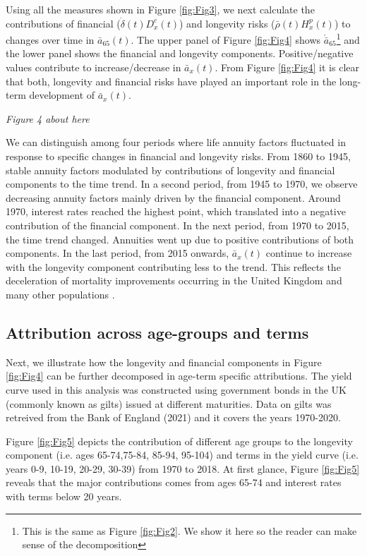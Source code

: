 \documentclass[12pt]{article}
\begin{document}
Using all the measures shown in Figure \ref{fig:Fig3}, we next calculate the contributions of financial ($\dot{\delta}(t){D}^{c}_x(t)$) and longevity risks ($\bar{\rho}(t){H}^{p}_x(t)$) to changes over time in $\bar{a}_{65}(t)$. The upper panel of Figure \ref{fig:Fig4} shows $\acute{\bar{a}}_{65}$\footnote{This is the same as Figure \ref{fig:Fig2}. We show it here so the reader can make sense of the decomposition} and the lower panel shows the financial and longevity components. Positive/negative values contribute to increase/decrease in $\bar{a}_x(t)$. From Figure \ref{fig:Fig4} it is clear that both, longevity and financial risks have played an important role in the long-term development of $\bar{a}_x(t)$. 

  \begin{center}
	\textit{Figure 4 about here}
\end{center}

We can distinguish among four periods where life annuity factors fluctuated in response to specific changes in financial and longevity risks. From 1860 to 1945, stable annuity factors modulated by  contributions of longevity and financial components to the time trend. In a second period, from 1945 to 1970, we observe decreasing annuity factors mainly driven by the financial component. Around 1970, interest rates reached the highest point, which translated into a negative contribution of the financial component. In the next period, from 1970 to 2015, the time trend changed. Annuities went up due to positive contributions of both components. In the last period, from 2015 onwards, $\bar{a}_x(t)$ continue to increase with the longevity component contributing less to the trend. This reflects the deceleration of mortality improvements occurring in the United Kingdom and many other populations \cite{djeundje2022slowdown}.
 
 \subsection{Attribution across age-groups and terms}

Next, we illustrate how the longevity and financial components in Figure \ref{fig:Fig4} can be further decomposed in age-term specific attributions. The yield curve used in this analysis was constructed using government bonds in the UK (commonly known as gilts) issued at different maturities. Data on gilts was retreived from the Bank of England (2021) and it covers the years 1970-2020.


 Figure \ref{fig:Fig5} depicts the contribution of different age groups to the longevity component (i.e. ages 65-74,75-84, 85-94, 95-104) and terms in the yield curve (i.e. years 0-9, 10-19, 20-29, 30-39) from 1970 to 2018. At first glance, Figure \ref{fig:Fig5} reveals that the major contributions comes from ages 65-74 and interest rates with terms below 20 years. 
\end{document}
